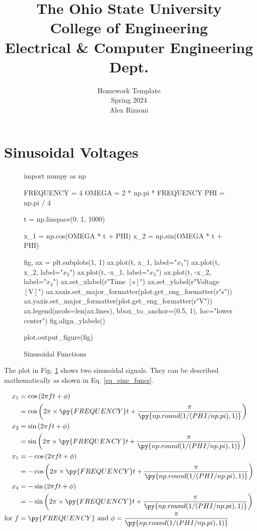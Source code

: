 \documentclass[10pt]{homework}
\author{Homework Template \\ Spring 2024 \\ Alex Rizzoni}
\title{\small The Ohio State University \\ College of Engineering \\ Electrical \& Computer Engineering Dept.}
\begin{document}
\section{Sinusoidal Voltages}

\begin{center}
    \begin{figure}
        \begin{pycode}
import numpy as np

FREQUENCY = 4
OMEGA = 2 * np.pi * FREQUENCY
PHI = np.pi / 4

t = np.linspace(0, 1, 1000)

x_1 = np.cos(OMEGA * t + PHI)
x_2 = np.sin(OMEGA * t + PHI)

fig, ax = plt.subplots(1, 1)
ax.plot(t, x_1, label="$x_1$")
ax.plot(t, x_2, label="$x_2$")
ax.plot(t, -x_1, label="$x_3$")
ax.plot(t, -x_2, label="$x_4$")
ax.set_xlabel(r"Time $\left[\mathrm{s}\right]$")
ax.set_ylabel(r"Voltage $\left[\mathrm{V}\right]$")
ax.xaxis.set_major_formatter(plot.get_eng_formatter(r"s"))
ax.yaxis.set_major_formatter(plot.get_eng_formatter(r"V"))
ax.legend(ncols=len(ax.lines), bbox_to_anchor=(0.5, 1), loc="lower center")
fig.align_ylabels()

plot.output_figure(fig)
        \end{pycode}
        \caption{Sinusoidal Functions}\label{fig_sine_funcs}
    \end{figure}
\end{center}

The plot in Fig. \ref{fig_sine_funcs} shows two sinusoidal signals. They can be described mathematically as shown in Eq. \ref{eq_sine_funcs}.

\begin{equation} \label{eq_sine_funcs}
    \begin{split}
        x_1 &= \cos\left(2\pi ft + \phi\right) \\
            &= \cos\left(2\pi \times \py{FREQUENCY}t + \frac{\pi}{\py{np.round(1/(PHI/np.pi), 1)}}\right) \\
        x_2 &= \sin\left(2\pi ft + \phi\right) \\
            &= \sin\left(2\pi \times \py{FREQUENCY}t + \frac{\pi}{\py{np.round(1/(PHI/np.pi), 1)}}\right) \\
        x_1 &= -\cos\left(2\pi ft + \phi\right) \\
            &= -\cos\left(2\pi \times \py{FREQUENCY}t + \frac{\pi}{\py{np.round(1/(PHI/np.pi), 1)}}\right) \\
        x_4 &= -\sin\left(2\pi ft + \phi\right) \\
            &= -\sin\left(2\pi \times \py{FREQUENCY}t + \frac{\pi}{\py{np.round(1/(PHI/np.pi), 1)}}\right) \\
        \mathrm{for\ } f &= \py{FREQUENCY} \mathrm{\ and\ } \phi = \frac{\pi}{\py{np.round(1/(PHI/np.pi), 1)}}
    \end{split}
\end{equation}
\end{document}
